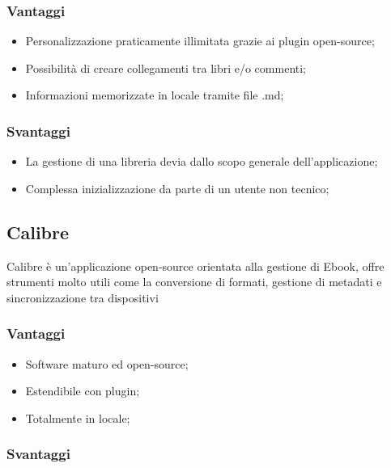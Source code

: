 \subsubsection{Vantaggi}\label{vantaggi}

\begin{itemize}
\item
  Personalizzazione praticamente illimitata grazie ai plugin
  open-source;
\item
  Possibilità di creare collegamenti tra libri e/o commenti;
\item
  Informazioni memorizzate in locale tramite file .md;
\end{itemize}

\subsubsection{Svantaggi}\label{svantaggi}

\begin{itemize}
\item
  La gestione di una libreria devia dallo scopo generale
  dell'applicazione;
\item
  Complessa inizializzazione da parte di un utente non tecnico;
\end{itemize}

\subsection{Calibre}\label{calibre}

Calibre è un'applicazione open-source orientata alla gestione di Ebook,
offre strumenti molto utili come la conversione di formati, gestione di
metadati e sincronizzazione tra dispositivi

\subsubsection{Vantaggi}\label{vantaggi-1}

\begin{itemize}
\item
  Software maturo ed open-source;
\item
  Estendibile con plugin;
\item
  Totalmente in locale;
\end{itemize}

\subsubsection{Svantaggi}\label{svantaggi-1}

